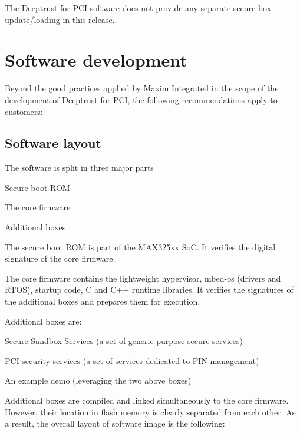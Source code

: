 The Deeptrust for P\+CI software does not provide any separate secure box update/loading in this release..\hypertarget{_p_c_i_g_u_i_d_a_n_c_e_sect_fwdev}{}\section{Software development}\label{_p_c_i_g_u_i_d_a_n_c_e_sect_fwdev}
Beyond the good practices applied by Maxim Integrated in the scope of the development of Deeptrust for P\+CI, the following recommendations apply to customers\+:\hypertarget{_p_c_i_g_u_i_d_a_n_c_e_sub_fwlayout}{}\subsection{Software layout}\label{_p_c_i_g_u_i_d_a_n_c_e_sub_fwlayout}
The software is split in three major parts
\begin{DoxyItemize}
\item Secure boot R\+OM
\item The core firmware
\item Additional boxes
\end{DoxyItemize}

The secure boot R\+OM is part of the M\+A\+X325xx SoC. It verifies the digital signature of the core firmware.

The core firmware contains the lightweight hypervisor, mbed-\/os (drivers and R\+T\+OS), startup code, C and C++ runtime libraries. It verifies the signatures of the additional boxes and prepares them for execution.

Additional boxes are\+:
\begin{DoxyItemize}
\item Secure Sandbox Services (a set of generic purpose secure services)
\item P\+CI security services (a set of services dedicated to P\+IN management)
\item An example demo (leveraging the two above boxes)
\end{DoxyItemize}

Additional boxes are compiled and linked simultaneously to the core firmware. However, their location in flash memory is clearly separated from each other. As a result, the overall layout of software image is the following\+:

